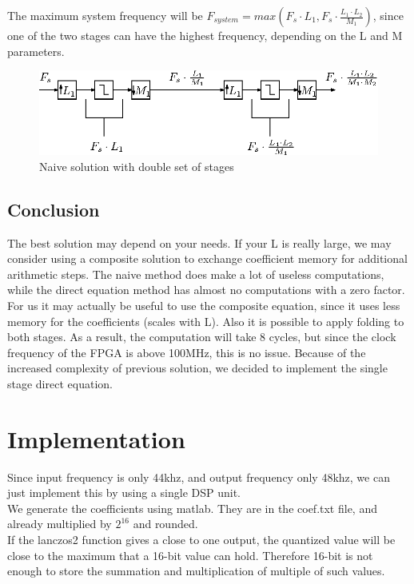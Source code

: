 \documentclass[a4paper,twoside,11pt, fleqn]{article}
\begin{document}
\smallskip
The maximum system frequency will be $F_{system} = max(F_s\cdot L_1, F_s\cdot \frac{L_1\cdot L_2}{M_1})$, since one of the two stages can have the highest frequency, depending on the L and M parameters.
\begin{figure}[h]
	\includegraphics[scale = 1]{Images/3_1}
    \caption{Naive solution with double set of stages}
\end{figure}

\subsection{Conclusion}
The best solution may depend on your needs. If your L is really large, we may consider using a composite solution to exchange coefficient memory for additional arithmetic steps. The naive method does make a lot of useless computations, while the direct equation method has almost no computations with a zero factor.\\ 

For us it may actually be useful to use the composite equation, since it uses less memory for the coefficients (scales with L). Also it is possible to apply folding to both stages. As a result, the computation will take 8 cycles, but since the clock frequency of the FPGA is above 100MHz, this is no issue. Because of the increased complexity of previous solution, we decided to implement the single stage direct equation.\\

\newpage
\section{Implementation}
Since input frequency is only 44khz, and output frequency only 48khz, we can just implement this by using a single DSP unit.\\

We generate the coefficients using matlab. They are in the coef.txt file, and already multiplied by $2^{16}$ and rounded.\\

If the lanczos2 function gives a close to one output, the quantized value will be close to the maximum that a 16-bit value can hold. Therefore 16-bit is not enough to store the summation and multiplication of multiple of such values.\\
\end{document}
